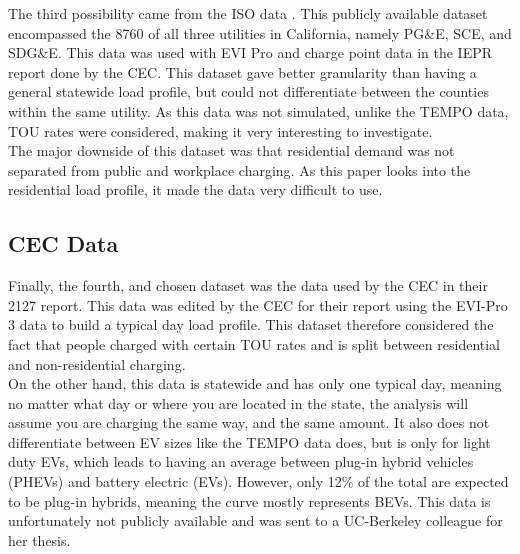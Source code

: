 \documentclass{article}
\begin{document}
The third possibility came from the ISO data \cite{ISO_dataset}. This publicly available dataset encompassed the 8760 of all three utilities in California, namely PG\&E, SCE, and SDG\&E. This data was used with EVI Pro and charge point data in the IEPR report done by the CEC. This dataset gave better granularity than having a general statewide load profile, but could not differentiate between the counties within the same utility. As this data was not simulated, unlike the TEMPO data, TOU rates were considered, making it very interesting to investigate.\\

The major downside of this dataset was that residential demand was not separated from public and workplace charging. As this paper looks into the residential load profile, it made the data very difficult to use.

\subsection{CEC Data}

Finally, the fourth, and chosen dataset was the data used by the CEC in their 2127 report. This data was edited by the CEC for their report using the EVI-Pro 3 data to build a typical day load profile. This dataset therefore considered the fact that people charged with certain TOU rates and is split between residential and non-residential charging.\\

On the other hand, this data is statewide and has only one typical day, meaning no matter what day or where you are located in the state, the analysis will assume you are charging the same way, and the same amount. It also does not differentiate between EV sizes like the TEMPO data does, but is only for light duty EVs, which leads to having an average between plug-in hybrid vehicles (PHEVs) and battery electric (EVs). However, only 12\% of the total are expected to be plug-in hybrids, meaning the curve mostly represents BEVs. This data is unfortunately not publicly available and was sent to a UC-Berkeley colleague for her thesis.\\
\end{document}
